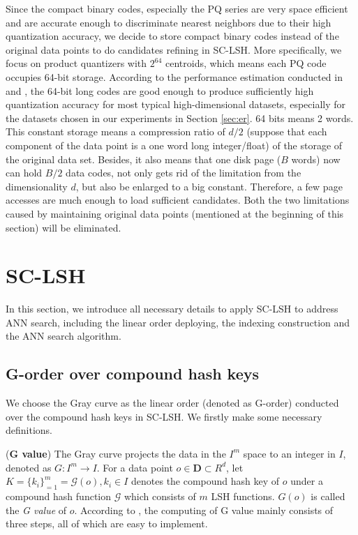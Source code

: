 \documentclass[twocolumn]{svjour3}          %
\begin{document}
Since the compact binary codes, especially the PQ series are very space efficient and are accurate enough to discriminate nearest neighbors due to their high quantization accuracy, we decide to store compact binary codes instead of the original data points to do candidates refining in SC-LSH.
More specifically, we focus on product quantizers with $2^{64}$ centroids, which means each PQ code occupies 64-bit storage. According to the performance estimation conducted in \cite{Jegou2011PQ} and \cite{Norouzi2013}, the 64-bit long codes are good enough to produce sufficiently high quantization accuracy for most typical high-dimensional datasets, especially for the datasets chosen in our experiments in Section \ref{sec:er}. 64 bits means 2 words. This constant storage means a compression ratio of $d/2$ (suppose that each component of the data point is a one word long integer/float) of the storage of the original data set. Besides, it also means that one disk page ($B$ words) now can hold $B/2$ data codes, not only gets rid of the limitation from the dimensionality $d$, but also be enlarged to a big constant. Therefore, a few page accesses are much enough to load sufficient candidates. Both the two limitations caused by maintaining original data points (mentioned at the beginning of this section) will be eliminated.

\section{SC-LSH}\label{sec:sclsh}
In this section, we introduce all necessary details to apply SC-LSH to address ANN search, including the linear order deploying, the indexing construction and the ANN search algorithm.

\subsection{G-order over compound hash keys}\label{ssec:linearorder}
We choose the Gray curve as the linear order (denoted as G-order) conducted over the compound hash keys in SC-LSH. We firstly make some necessary definitions.

\begin{definition}
\label{def:g-order}
(\textbf{G value}) The Gray curve projects the data in the $I^m$ space to an integer in $I$, denoted as $G:I^m\rightarrow I$. For a data point $o\in \textbf{D} \subset R^d$, let $K=\{k_i\}_{=1}^m=\mathcal{G}(o), k_i \in I$ denotes the compound hash key of $o$ under a compound hash function $\mathcal{G}$ which consists of $m$ LSH functions. $G(o)$ is called the \emph{G value} of $o$. According to \cite{Faloutsos1989Fractals}, the computing of G value mainly consists of three steps, all of which are easy to implement.
\end{definition}
\end{document}
